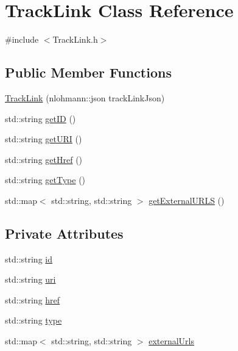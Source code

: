 \hypertarget{class_track_link}{}\section{Track\+Link Class Reference}
\label{class_track_link}


{\ttfamily \#include $<$Track\+Link.\+h$>$}

\subsection*{Public Member Functions}
\begin{DoxyCompactItemize}
\item 
\mbox{\hyperlink{class_track_link_a3534cccba532f6940ceca8f9c6eb8d25}{Track\+Link}} (nlohmann\+::json track\+Link\+Json)
\item 
std\+::string \mbox{\hyperlink{class_track_link_afb6168a88cf533689f46f77648e870c9}{get\+ID}} ()
\item 
std\+::string \mbox{\hyperlink{class_track_link_a81f25509c8a6f0565e9183aeac92f802}{get\+U\+RI}} ()
\item 
std\+::string \mbox{\hyperlink{class_track_link_a10db68bd5613d2f6a2c6c30006cd55fe}{get\+Href}} ()
\item 
std\+::string \mbox{\hyperlink{class_track_link_aa0d629e97bf8d6ebf492f575fd9f7108}{get\+Type}} ()
\item 
std\+::map$<$ std\+::string, std\+::string $>$ \mbox{\hyperlink{class_track_link_a6ec0e6dcce0e8d6dcc53b25cac578d49}{get\+External\+U\+R\+LS}} ()
\end{DoxyCompactItemize}
\subsection*{Private Attributes}
\begin{DoxyCompactItemize}
\item 
std\+::string \mbox{\hyperlink{class_track_link_a0b93d8e0161b088a905a6efc031be395}{id}}
\item 
std\+::string \mbox{\hyperlink{class_track_link_abac6786ff59efc469845a196eebdf63b}{uri}}
\item 
std\+::string \mbox{\hyperlink{class_track_link_af1f738ca4c5cd1a8c612a98f9f7527d5}{href}}
\item 
std\+::string \mbox{\hyperlink{class_track_link_add28e057c305bdf0d385fc3a8326c39f}{type}}
\item 
std\+::map$<$ std\+::string, std\+::string $>$ \mbox{\hyperlink{class_track_link_ab7723b5d1970c0942f27f42f075763fc}{external\+Urls}}
\end{DoxyCompactItemize}


